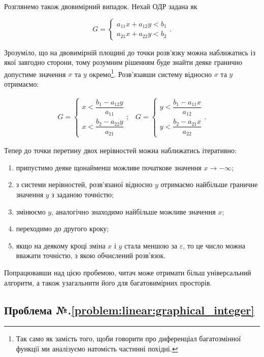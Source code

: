\documentclass[\main/book.tex]{subfiles}
\begin{document}
Розглянемо також двовимірний випадок. Нехай ОДР задана як

\[
 G = \left\{
  \begin{array}{l}
   a_{11} x + a_{12} y < b_1 \\
   a_{21} x + a_{22} y < b_2
  \end{array}
 \right..
\]

Зрозуміло, що на двовимірній площині до точки розв'язку можна наближатись із якої завгодно сторони, тому розумним рішенням буде знайти деяке гранично допустиме значення $x$ та $y$ окремо\footnote{Так само як замість того, щоби говорити про диференціал багатозмінної функції ми аналізуємо натомість частинні похідні.}. Розв'язавши систему відносно $x$ та $y$ отримаємо:

\[
 \begin{array}{ll}
 G = \left\{
  \begin{array}{l}
   x < \dfrac{b_1 - a_{12} y}{a_{11}} \\
   x < \dfrac{b_2 - a_{22} y}{a_{21}}
  \end{array}
 \right.;
 &
 G = \left\{
  \begin{array}{l}
   y < \dfrac{b_1 - a_{11} x}{a_{12}} \\
   y < \dfrac{b_2 - a_{21} x}{a_{22}}
  \end{array}
 \right..
 \end{array}
\]

Тепер до точки перетину двох нерівностей можна наближатись ітеративно:

\begin{enumerate}
 \item припустимо деяке щонайменш можливе початкове значення ${x \to -\infty}$;
 \item з системи нерівностей, розв'язаної відносно $y$ отримаємо найбільше граничне значення $y$ з заданою точністю;
 \item змінюємо $y$, аналогічно знаходимо найбільше можливе значення $x$;
 \item переходимо до другого кроку;
 \item якщо на деякому кроці зміна $x$ і $y$ стала меншою за $\varepsilon$, то це число можна вважати точністю, з якою обчислений розв'язок.
\end{enumerate}

Попрацювавши над цією пробемою, читач може отримати більш універсальний алгоритм, а також узагальнити його для багатовимірних просторів.

\subsection*{Проблема №.\ref{problem:linear:graphical_integer}}
\end{document}
